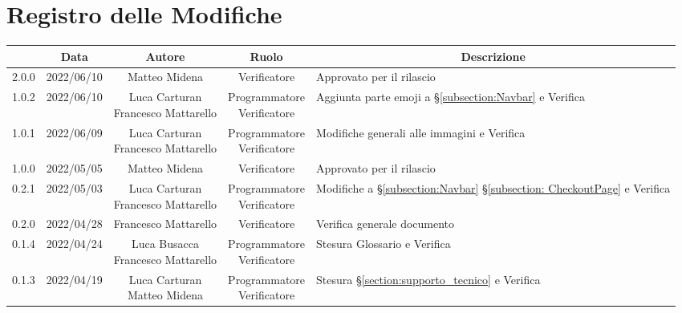 \thispagestyle{empty}
\section*{Registro delle Modifiche}

\begin{center}
	\renewcommand{\arraystretch}{1.8}
	\begin{longtable}[c]{c | c | c | c | p{5cm}}
		\rowcolor[HTML]{125E28}
		\multicolumn{1}{c}{\color[HTML]{FFFFFF} \textbf{Versione}} & 
		\multicolumn{1}{c}{\color[HTML]{FFFFFF} \textbf{Data}} & 
		\multicolumn{1}{c}{\color[HTML]{FFFFFF} \textbf{Autore}} & 
		\multicolumn{1}{c}{\color[HTML]{FFFFFF} \textbf{Ruolo}} & 
		\multicolumn{1}{c}{\color[HTML]{FFFFFF} \textbf{Descrizione}} \\
		\endhead
		2.0.0 & 2022/06/10 & Matteo Midena & Verificatore & Approvato per il rilascio\\
		1.0.2 & 2022/06/10 & \Shortunderstack{Luca Carturan\\Francesco Mattarello} & \Shortunderstack{Programmatore\\Verificatore} & Aggiunta parte emoji a §\ref{subsection:Navbar} e Verifica\\
		1.0.1 & 2022/06/09 & \Shortunderstack{Luca Carturan\\Francesco Mattarello} & \Shortunderstack{Programmatore\\Verificatore} & Modifiche generali alle immagini e Verifica\\
		1.0.0 & 2022/05/05 & Matteo Midena & Verificatore & Approvato per il rilascio\\
		0.2.1 & 2022/05/03 & \Shortunderstack{Luca Carturan\\Francesco Mattarello} & \Shortunderstack{Programmatore\\Verificatore} & Modifiche a §\ref{subsection:Navbar} §\ref{subsection: CheckoutPage} e Verifica\\
		0.2.0 & 2022/04/28 & Francesco Mattarello & Verificatore & Verifica generale documento\\
		0.1.4 & 2022/04/24 & \Shortunderstack{Luca Busacca\\Francesco Mattarello} & \Shortunderstack{Programmatore\\Verificatore} & Stesura Glossario e Verifica\\
		0.1.3 & 2022/04/19 & \Shortunderstack{Luca Carturan\\Matteo Midena} & \Shortunderstack{Programmatore\\Verificatore} & Stesura §\ref{section:supporto_tecnico} e Verifica\\

\end{longtable}
\end{center}
